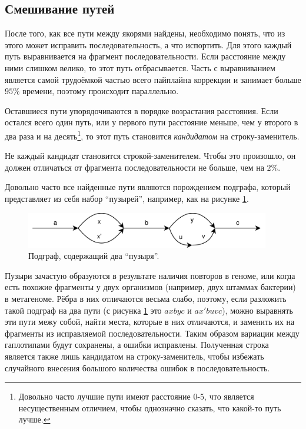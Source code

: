 \documentclass[14pt]{matmex-diploma-custom}
\begin{document}
\subsection{Смешивание путей}
После того, как все пути между якорями найдены, необходимо понять, что из этого может исправить последовательность, а что испортить. 
Для этого каждый путь выравнивается на фрагмент последовательности. Если расстояние между ними слишком велико, то этот путь отбрасывается. Часть с выравниванием является самой трудоёмкой частью всего пайплайна коррекции и занимает больше $95\%$ времени, поэтому происходит параллельно.

Оставшиеся пути упорядочиваются в порядке возрастания расстояния. Если остался всего один путь, или у первого пути расстояние меньше, чем у второго в два раза и на десять\footnote{Довольно часто лучшие пути имеют расстояние 0-5, что является несущественным отличием, чтобы однозначно сказать, что какой-то путь лучше.}, то этот путь становится \textit{кандидатом} на строку-заменитель.

Не каждый кандидат становится строкой-заменителем. Чтобы это произошло, он должен отличаться от фрагмента последовательности не больше, чем на $2\%$.

Довольно часто все найденные пути являются порождением подграфа, который представляет из себя набор ``пузырей'', например, как на рисунке \ref{fig:buldges}. 

\begin{figure}[h]
    \centering
    \includegraphics[width=0.95\textwidth]{buldges.png}
    \caption{Подграф, содержащий два ``пузыря''.}
    \label{fig:buldges}
\end{figure}

Пузыри зачастую образуются в результате наличия повторов в геноме, или когда есть похожие фрагменты у двух организмов (например, двух штаммах бактерии) в метагеноме. Рёбра в них отличаются весьма слабо, поэтому, если разложить такой подграф на два пути (с рисунка \ref{fig:buldges} это $axbyc$ и $ax'buvc$), можно выравнять эти пути межу собой, найти места, которые в них отличаются, и заменить их на фрагменты из исправляемой последовательности. Таким образом вариации между гаплотипами будут сохранены, а ошибки исправлены. Полученная строка является также лишь кандидатом на строку-заменитель, чтобы избежать случайного внесения большого количества ошибок в последовательность.
\end{document}

